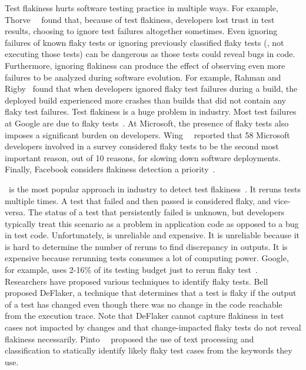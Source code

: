\documentclass[conference]{IEEEtran}
\begin{document}
Test flakiness hurts software testing practice in multiple ways. For example, Thorve~\etal{}~\cite{thorve2018empirical} found that, because of test flakiness, developers lost trust in test results, choosing to ignore test failures altogether sometimes. Even ignoring failures of known flaky tests or ignoring previously classified flaky tests (\ie{}, not executing those tests) can be dangerous as those tests could reveal bugs in code. Furthermore, ignoring flakiness can produce the effect of observing even more failures to be analyzed during software evolution. For example, Rahman and Rigby~\cite{rahman-rigby-fse2018} found that when developers ignored flaky test failures during a build, the deployed build experienced more crashes than builds that did not contain any flaky test failures. 
Test flakiness is a huge problem in industry. Most test failures at Google are due to flaky tests~\cite{john-mico-google2016,jeff-listfield-google2017}. At Microsoft, the presence of flaky tests also imposes a significant burden on developers. Wing~\etal{}~\cite{wing-etal-issta11} reported that 58 Microsoft developers involved in a survey considered flaky tests to be the second most important reason, out of 10 reasons, for slowing down software deployments. Finally, Facebook considers flakiness detection a priority~\cite{DBLP:conf/scam/HarmanO18}. 

\rerun\ is the most popular approach in industry to detect test flakiness~\cite{john-mico-google2016,flakiness-at-spotify}. 
It reruns tests multiple times. A test that failed and then passed is considered flaky, and vice-versa. The status of a test that persistently failed is unknown, but developers typically treat this scenario as a problem in application code as opposed to a bug in test code. Unfortunately, \rerun{} is unreliable and expensive. It is unreliable because it is hard to determine the number of reruns to find discrepancy in outputs. It is expensive because rerunning tests consumes a lot of computing power. Google, for example, uses 2-16\% of its testing budget just to rerun flaky test~\cite{john-mico-google2016}. Researchers have proposed various techniques to identify flaky tests. Bell~\etal{}~\cite{bell2018d} proposed DeFlaker, a technique that determines that a test is flaky if the output of a test has changed even though there was no change in the code reachable from the execution trace. Note that DeFlaker cannot capture flakiness in test cases not impacted by changes and that change-impacted flaky tests do not reveal flakiness necessarily. Pinto~\etal~\cite{pinto-etal-msr2020} proposed the use of text processing and classification to statically identify likely flaky test cases from the keywords they use. 
\end{document}
